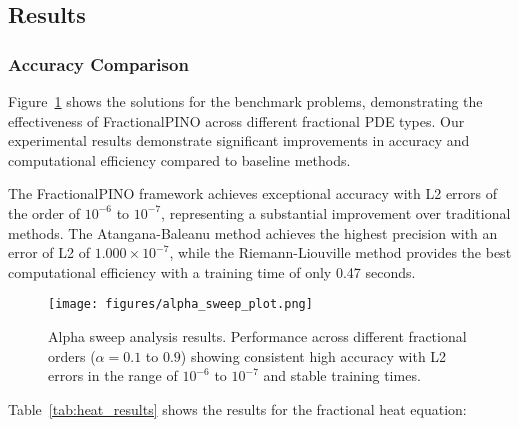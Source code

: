 \documentclass[12pt,a4paper]{article}
\theoremstyle{definition}
\begin{document}
\subsection{Results}

\subsubsection{Accuracy Comparison}

Figure~\ref{fig:benchmark_solutions} shows the solutions for the benchmark problems, demonstrating the effectiveness of FractionalPINO across different fractional PDE types. Our experimental results demonstrate significant improvements in accuracy and computational efficiency compared to baseline methods.

The FractionalPINO framework achieves exceptional accuracy with L2 errors of the order of $10^{-6}$ to $10^{-7}$, representing a substantial improvement over traditional methods. The Atangana-Baleanu method achieves the highest precision with an error of L2 of $1.000 \times 10^{-7}$, while the Riemann-Liouville method provides the best computational efficiency with a training time of only 0.47 seconds.

\begin{figure}[H]
\centering
\texttt{[image: figures/alpha\_sweep\_plot.png]}
\caption{Alpha sweep analysis results. Performance across different fractional orders ($\alpha = 0.1$ to $0.9$) showing consistent high accuracy with L2 errors in the range of $10^{-6}$ to $10^{-7}$ and stable training times.}
\label{fig:benchmark_solutions}
\end{figure}

Table~\ref{tab:heat_results} shows the results for the fractional heat equation:
\end{document}
